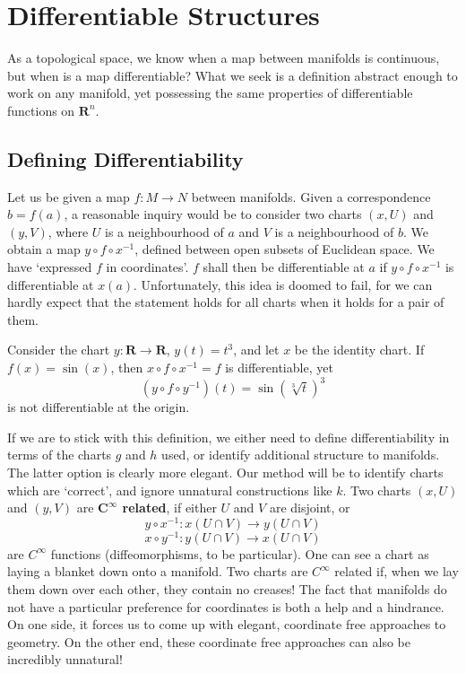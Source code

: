 \chapter{Differentiable Structures}

As a topological space, we know when a map between manifolds is continuous, but when is a map differentiable? What we seek is a definition abstract enough to work on any manifold, yet possessing the same properties of differentiable functions on $\mathbf{R}^n$.

\section{Defining Differentiability}

Let us be given a map $f:M \to N$ between manifolds. Given a correspondence $b = f(a)$, a reasonable inquiry would be to consider two charts $(x,U)$ and $(y,V)$, where $U$ is a neighbourhood of $a$ and $V$ is a neighbourhood of $b$. We obtain a map $y \circ f \circ x^{-1}$, defined between open subsets of Euclidean space. We have `expressed $f$ in coordinates'. $f$ shall then be differentiable at $a$ if $y \circ f \circ x^{-1}$ is differentiable at $x(a)$. Unfortunately, this idea is doomed to fail, for we can hardly expect that the statement holds for all charts when it holds for a pair of them.

\begin{example}
    Consider the chart $y: \mathbf{R} \to \mathbf{R}$, $y(t) = t^3$, and let $x$ be the identity chart. If $f(x) = \sin(x)$, then $x \circ f \circ x^{-1} = f$ is differentiable, yet
    \[ (y \circ f \circ y^{-1})(t) = \sin(\sqrt[3]{t})^3 \]
    is not differentiable at the origin.
\end{example}

If we are to stick with this definition, we either need to define differentiability in terms of the charts $g$ and $h$ used, or identify additional structure to manifolds. The latter option is clearly more elegant. Our method will be to identify charts which are `correct', and ignore unnatural constructions like $k$. Two charts $(x,U)$ and $(y,V)$ are {\bf $\mathbf{C^\infty}$ related}, if either $U$ and $V$ are disjoint, or
%
\[ y \circ x^{-1} : x(U \cap V) \to y(U \cap V) \]
%
\[ x \circ y^{-1} : y(U \cap V) \to x(U \cap V) \]
%
are $C^\infty$ functions (diffeomorphisms, to be particular). One can see a chart as laying a blanket down onto a manifold. Two charts are $C^\infty$ related if, when we lay them down over each other, they contain no creases! The fact that manifolds do not have a particular preference for coordinates is both a help and a hindrance. On one side, it forces us to come up with elegant, coordinate free approaches to geometry. On the other end, these coordinate free approaches can also be incredibly unnatural!

